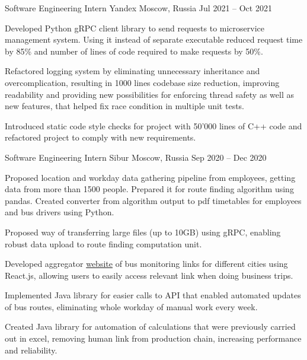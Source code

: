 

\begin{cventries}

  \cventry
  {Software Engineering Intern} %
  {Yandex} %
  {Moscow, Russia} %
  {Jul 2021 -- Oct 2021} %
  {
    \begin{cvitems} %
      \item Developed Python gRPC client library to send requests to microservice management system. Using it instead of separate executable
      reduced request time by 85\% and number of lines of code required to make requests by 50\%.
      \item Refactored logging system by eliminating unnecessary inheritance and overcomplication, resulting in 1000 lines codebase size reduction, improving readability
      and providing new possibilities for enforcing thread safety as well as new features, that helped fix race condition in multiple unit tests.
      \item Introduced static code style checks for project with 50'000 lines of C++ code and refactored project to comply with new requirements.
    \end{cvitems}
  }

  \cventry
  {Software Engineering Intern} %
  {Sibur} %
  {Moscow, Russia} %
  {Sep 2020 -- Dec 2020} %
  {
    \begin{cvitems} %
      \item Proposed location and workday data gathering pipeline from employees, getting data from more than 1500 people. Prepared it for route finding algorithm using pandas. Created converter from algorithm output to pdf timetables for employees and bus drivers using Python.
      \item Proposed way of transferring large files (up to 10GB) using gRPC, enabling robust data upload to route finding computation unit.
      \item Developed aggregator \href{https://www.sibur.ru/bus/}{website} of bus monitoring links for different cities using React.js, allowing users to easily access relevant link when doing business trips.
      \item Implemented Java library for easier calls to API that enabled automated updates of bus routes, eliminating whole workday of manual work every week.
      \item Created Java library for automation of calculations that were previously carried out in excel, removing human link from production chain, increasing performance and reliability.
    \end{cvitems}
  }

\end{cventries}
